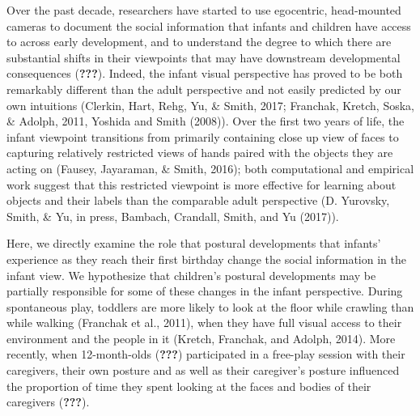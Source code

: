 \documentclass[english,man,floatsintext,draftall]{apa6}
\begin{document}
Over the past decade, researchers have started to use egocentric,
head-mounted cameras to document the social information that infants and
children have access to across early development, and to understand the
degree to which there are substantial shifts in their viewpoints that
may have downstream developmental consequences ({\textbf{???}}). Indeed,
the infant visual perspective has proved to be both remarkably different
than the adult perspective and not easily predicted by our own
intuitions (Clerkin, Hart, Rehg, Yu, \& Smith, 2017; Franchak, Kretch,
Soska, \& Adolph, 2011, Yoshida and Smith (2008)). Over the first two
years of life, the infant viewpoint transitions from primarily
containing close up view of faces to capturing relatively restricted
views of hands paired with the objects they are acting on (Fausey,
Jayaraman, \& Smith, 2016); both computational and empirical work
suggest that this restricted viewpoint is more effective for learning
about objects and their labels than the comparable adult perspective (D.
Yurovsky, Smith, \& Yu, in press, Bambach, Crandall, Smith, and Yu
(2017)).

Here, we directly examine the role that postural developments that
infants' experience as they reach their first birthday change the social
information in the infant view. We hypothesize that children's postural
developments may be partially responsible for some of these changes in
the infant perspective. During spontaneous play, toddlers are more
likely to look at the floor while crawling than while walking (Franchak
et al., 2011), when they have full visual access to their environment
and the people in it (Kretch, Franchak, and Adolph, 2014). More
recently, when 12-month-olds ({\textbf{???}}) participated in a
free-play session with their caregivers, their own posture and as well
as their caregiver's posture influenced the proportion of time they
spent looking at the faces and bodies of their caregivers
({\textbf{???}}).
\end{document}
